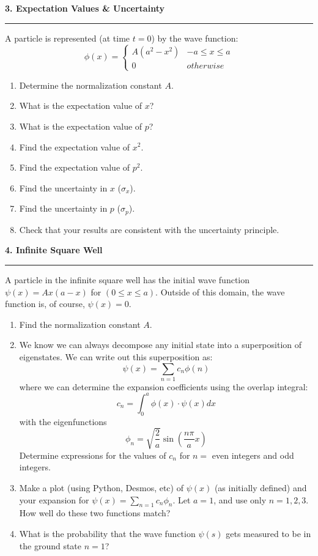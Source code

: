 \documentclass{article}
\begin{document}
\vspace{0.5cm}

\noindent \textbf{3. Expectation Values \& Uncertainty}
\hrule
\vspace{0.3cm}

\noindent A particle is represented (at time $t=0$) by the wave function:
\[\phi(x) =  \begin{cases} 
      A(a^2-x^2) & -a\leq x \leq a \\
      0 & otherwise 
   \end{cases}\]

\begin{enumerate}[label=\alph*.]
    \item Determine the normalization constant $A$.
    \item What is the expectation value of $x$?
    \item What is the expectation value of $p$?
    \item Find the expectation value of $x^2$.
    \item Find the expectation value of $p^2$.
    \item Find the uncertainty in $x$ ($\sigma_x$).
    \item Find the uncertainty in $p$ ($\sigma_p$).
    \item Check that your results are consistent with the uncertainty principle.
\end{enumerate}

\noindent \textbf{4. Infinite Square Well}
\hrule
\vspace{0.3cm}

\noindent A particle in the infinite square well has the initial wave function $\psi(x) = Ax(a-x)$ for $(0 \leq x \leq a)$. Outside of this domain, the wave function is, of course, $\psi(x) = 0$.
\begin{enumerate}[label=\alph*.]
    \item Find the normalization constant $A$.
    \item We know we can always decompose any initial state into a superposition of eigenstates. We can write out this superposition as:
    \[\psi(x) = \sum_{n=1} c_n\phi(n)\]
    where we can determine the expansion coefficients using the overlap integral:
    \[c_n = \int_{0}^{a} \phi(x) \cdot \psi(x)dx\]
    with the eigenfunctions
    \[\phi_n = \sqrt{\frac 2 a} \sin\left(\frac{n\pi}{a}x\right)\]
    Determine expressions for the values of $c_n$ for $n=$ even integers and odd integers.
    \item Make a plot (using Python, Desmos, etc) of $\psi(x)$ (as initially defined) and your expansion for $\displaystyle \psi(x) = \sum_{n=1}c_n\phi_n$. Let $a=1$, and use only $n=1,2,3$. How well do these two functions match?
    \item What is the probability that the wave function $\psi(s)$ gets measured to be in the ground state $n=1$?
\end{enumerate}
\end{document}
